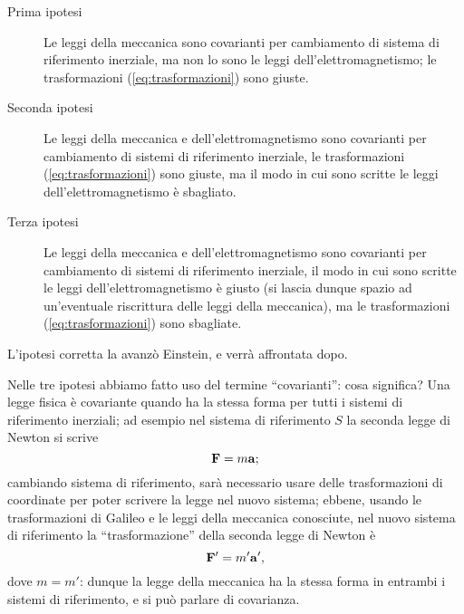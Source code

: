 \begin{description}
\item [Prima ipotesi] Le leggi della meccanica sono covarianti per
  cambiamento di sistema di riferimento inerziale, ma non lo sono le
  leggi dell'elettromagnetismo; le trasformazioni
  (\ref{eq:trasformazioni}) sono giuste.
\item [Seconda ipotesi] Le leggi della meccanica e
  dell'elettromagnetismo sono covarianti per cambiamento di sistemi di
  riferimento inerziale, le trasformazioni (\ref{eq:trasformazioni})
  sono giuste, ma il modo in cui sono scritte le leggi
  dell'elettromagnetismo \`e sbagliato.
\item [Terza ipotesi] Le leggi della meccanica e
  dell'elettromagnetismo sono covarianti per cambiamento di sistemi di
  riferimento inerziale, il modo in cui sono scritte le leggi
  dell'elettromagnetismo \`e giusto (si lascia dunque spazio ad
	    un'eventuale riscrittura delle leggi della meccanica), ma le
	    trasformazioni
  (\ref{eq:trasformazioni}) sono sbagliate.
\end{description}
L'ipotesi corretta la avanz\`o Einstein, e verr\`a affrontata dopo. 

Nelle tre ipotesi abbiamo fatto uso del termine ``covarianti'':
cosa significa? Una legge fisica \`e covariante quando ha la stessa
forma per tutti i sistemi di riferimento inerziali; ad esempio nel
sistema di riferimento $S$ la seconda legge
di Newton si scrive 
\begin{displaymath}
 \mathbf{F} = m\mathbf{a}; 
\end{displaymath}
cambiando sistema di riferimento, sar\`a necessario usare delle
trasformazioni di coordinate per poter scrivere la legge nel nuovo
sistema; ebbene, usando le trasformazioni di Galileo e le leggi della
meccanica conosciute, nel nuovo sistema di riferimento la
``trasformazione'' della seconda legge di Newton \`e
\begin{displaymath}
  \mathbf{F'} = m'\mathbf{a'},
\end{displaymath}
dove \(m = m'\): dunque la legge della meccanica ha la stessa forma in
entrambi i sistemi di riferimento, e si pu\`o parlare di covarianza.


